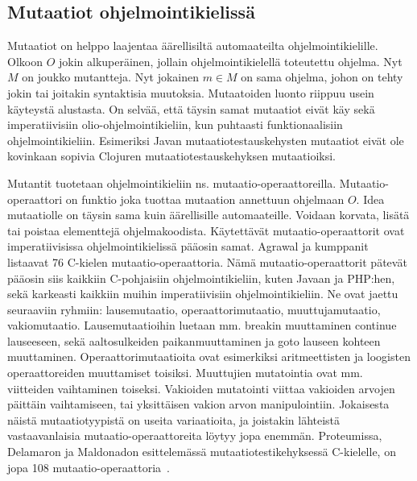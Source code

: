\documentclass{tktltiki}
\begin{document}
\subsection{Mutaatiot ohjelmointikielissä}
Mutaatiot on helppo laajentaa äärellisiltä automaateilta ohjelmointikielille. Olkoon $O$ jokin alkuperäinen, jollain ohjelmointikielellä toteutettu ohjelma. Nyt $M$ on joukko mutantteja. Nyt jokainen $m\in M$ on sama ohjelma, johon on tehty jokin tai joitakin syntaktisia muutoksia. Mutaatoiden luonto riippuu usein käyteystä alustasta. On selvää, että täysin samat mutaatiot eivät käy sekä imperatiivisiin olio-ohjelmointikieliin, kun puhtaasti funktionaalisiin ohjelmointikieliin. Esimeriksi Javan mutaatiotestauskehysten mutaatiot eivät ole kovinkaan sopivia Clojuren mutaatiotestauskehyksen mutaatioiksi. 

Mutantit tuotetaan ohjelmointikieliin ns. mutaatio-operaattoreilla. Mutaatio-operaattori on funktio joka tuottaa mutaation annettuun ohjelmaan $O$. Idea mutaatiolle on täysin sama kuin äärellisille automaateille. Voidaan korvata, lisätä tai poistaa elementtejä ohjelmakoodista. Käytettävät mutaatio-operaattorit ovat imperatiivisissa ohjelmointikielissä pääosin samat. Agrawal ja kumppanit listaavat 76 C-kielen mutaatio-operaattoria. Nämä mutaatio-operaattorit pätevät pääosin siis kaikkiin C-pohjaisiin ohjelmointikieliin, kuten Javaan ja PHP:hen, sekä karkeasti kaikkiin muihin imperatiivisiin ohjelmointikieliin. Ne ovat jaettu seuraaviin ryhmiin: lausemutaatio, operaattorimutaatio, muuttujamutaatio, vakiomutaatio. Lausemutaatioihin luetaan mm. breakin muuttaminen continue lauseeseen, sekä aaltosulkeiden paikanmuuttaminen ja goto lauseen kohteen muuttaminen. Operaattorimutaatioita ovat esimerkiksi aritmeettisten ja loogisten operaattoreiden muuttamiset toisiksi. Muuttujien mutatointia ovat mm. viitteiden vaihtaminen toiseksi. Vakioiden mutatointi viittaa vakioiden arvojen päittäin vaihtamiseen, tai yksittäisen vakion arvon manipulointiin. Jokaisesta näistä mutaatiotyypistä on useita variaatioita, ja joistakin lähteistä vastaavanlaisia mutaatio-operaattoreita löytyy jopa enemmän. Proteumissa, Delamaron ja Maldonadon esittelemässä mutaatiotestikehyksessä C-kielelle, on jopa 108 mutaatio-operaattoria~\cite{}. 
\end{document}
